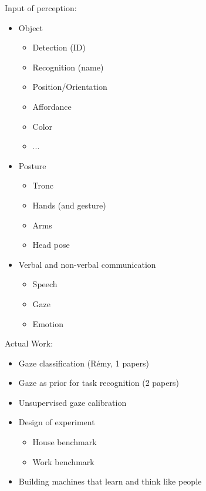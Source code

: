 \documentclass{beamer}
\begin{document}
\begin{frame}
Input of perception:
\begin{itemize}
\item Object
\begin{itemize}
\item Detection (ID)
\item Recognition (name)
\item Position/Orientation
\item Affordance
\item Color
\item ...
\end{itemize}
\item Posture
\begin{itemize}
\item Tronc
\item Hands (and gesture)
\item Arms
\item Head pose
\end{itemize}
\item Verbal and non-verbal communication
\begin{itemize}
\item Speech
\item Gaze
\item Emotion
\end{itemize}
\end{itemize}
\end{frame}

\begin{frame}
Actual Work:
\begin{itemize}
\item Gaze classification (Rémy, 1 papers)
\item Gaze as prior for task recognition (2 papers)
\item Unsupervised gaze calibration
\item Design of experiment
\begin{itemize}
\item House benchmark
\item Work benchmark
\end{itemize}
\item Building machines that learn and think like people
\end{itemize}
\end{frame}
\end{document}
